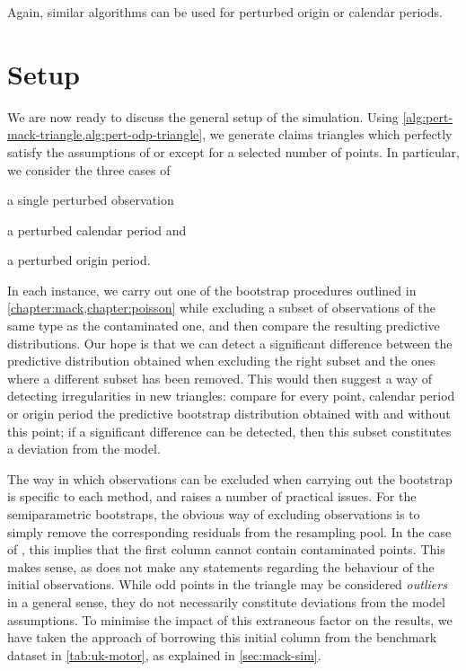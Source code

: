 \documentclass[a4paper]{book}
\begin{document}
Again, similar algorithms can be used for perturbed origin or calendar periods.

\section{Setup}

We are now ready to discuss the general setup of the simulation. Using \cref{alg:pert-mack-triangle,alg:pert-odp-triangle}, we generate claims triangles which perfectly satisfy the assumptions of  or  except for a selected number of points. In particular, we consider the three cases of 
\begin{inparaenum}[(i)]
\item a single perturbed observation
\item a perturbed calendar period and
\item a perturbed origin period.
\end{inparaenum}
In each instance, we carry out one of the bootstrap procedures outlined in \cref{chapter:mack,chapter:poisson} while excluding a subset of observations of the same type as the contaminated one, and then compare the resulting predictive distributions. Our hope is that we can detect a significant difference between the predictive distribution obtained when excluding the right subset and the ones where a different subset has been removed. This would then suggest a way of detecting irregularities in new triangles: compare for every point, calendar period or origin period the predictive bootstrap distribution obtained with and without this point; if a significant difference can be detected, then this subset constitutes a deviation from the model.

The way in which observations can be excluded when carrying out the bootstrap is specific to each method, and raises a number of practical issues. For the semiparametric bootstraps, the obvious way of excluding observations is to simply remove the corresponding residuals from the resampling pool. In the case of , this implies that the first column cannot contain contaminated points. This makes sense, as  does not make any statements regarding the behaviour of the initial observations. While odd points in the triangle may be considered \emph{outliers} in a general sense, they do not necessarily constitute deviations from the model assumptions. To minimise the impact of this extraneous factor on the results, we have taken the approach of borrowing this initial column from the benchmark dataset in \cref{tab:uk-motor}, as explained in \cref{sec:mack-sim}. 
\end{document}

